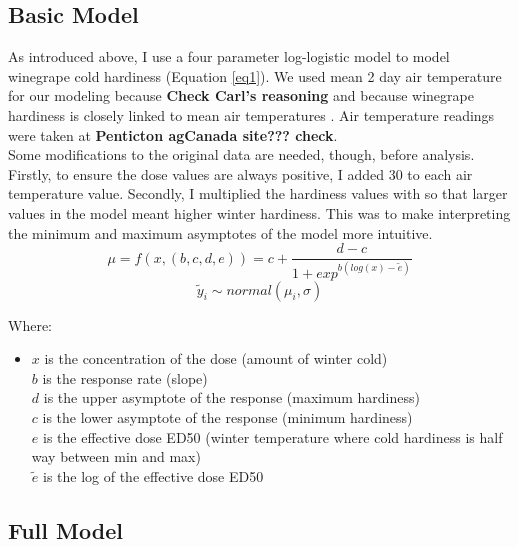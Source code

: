 \documentclass[11pt,letter]{article}
\begin{document}
\subsection {Basic Model}

As introduced above, I use a four parameter log-logistic model to model winegrape cold hardiness (Equation \ref{eq1}). We used mean 2 day air temperature for our modeling because \textbf{Check Carl's reasoning} and because winegrape hardiness is closely linked to mean air temperatures \cite{Hubackova1996}. Air temperature readings were taken at \textbf{Penticton agCanada site??? check}. \\

Some modifications to the original data are needed, though, before analysis. Firstly, to ensure the dose values are always positive, I added 30 to each air temperature value. Secondly, I multiplied the hardiness values with  so that larger values in the model meant higher winter hardiness. This was to make interpreting the minimum and maximum asymptotes of the model more intuitive. \\

\begin{equation} \label{eq1}
\mu=f(x,(b,c,d,e))=c+\frac{d-c}{1+exp^{b(log(x)-\tilde{e})}} 
\end{equation}
\begin{equation}
\label{eq:2}
\tilde{y}_{i}\sim normal(\mu_{i},\sigma)
\end{equation}

Where:
\begin{itemize}
\item[]	$x$ is the concentration of the dose (amount of winter cold) \\
$b$ is the response rate (slope)\\
$d$ is the upper asymptote of the response (maximum hardiness)\\
$c$ is the lower asymptote of the response (minimum hardiness)\\
$e$ is the effective dose ED50 (winter temperature where cold hardiness is half way between min and max)  \\
$\tilde{e}$ is the log of the effective dose ED50\\
\end{itemize}

\subsection {Full Model}
\end{document}
